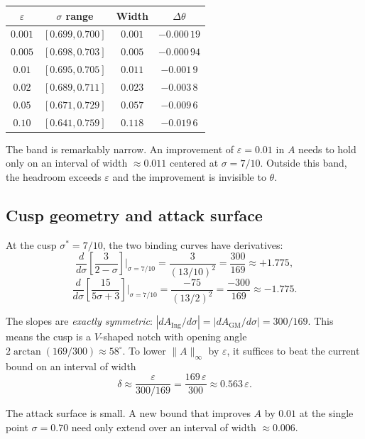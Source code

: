 \documentclass[11pt,a4paper]{article}
\begin{document}
\begin{center}
\begin{tabular}{cccc}
\toprule
$\varepsilon$ & $\sigma$ range & Width & $\Delta\theta$ \\
\midrule
$0.001$ & $[0.699, 0.700]$ & $0.001$ & $-0.000\,19$ \\
$0.005$ & $[0.698, 0.703]$ & $0.005$ & $-0.000\,94$ \\
$0.01$  & $[0.695, 0.705]$ & $0.011$ & $-0.001\,9$  \\
$0.02$  & $[0.689, 0.711]$ & $0.023$ & $-0.003\,8$  \\
$0.05$  & $[0.671, 0.729]$ & $0.057$ & $-0.009\,6$  \\
$0.10$  & $[0.641, 0.759]$ & $0.118$ & $-0.019\,6$  \\
\bottomrule
\end{tabular}
\end{center}

The band is remarkably narrow.  An improvement of $\varepsilon = 0.01$ in $A$ needs to hold only on an interval of width $\approx 0.011$ centered at $\sigma = 7/10$.  Outside this band, the headroom exceeds $\varepsilon$ and the improvement is invisible to $\theta$.

\subsection*{Cusp geometry and attack surface}

At the cusp $\sigma^{*} = 7/10$, the two binding curves have derivatives:
\[
  \frac{d}{d\sigma}\!\left[\frac{3}{2 - \sigma}\right]\bigg|_{\sigma = 7/10}
  = \frac{3}{(13/10)^{2}} = \frac{300}{169} \approx +1.775,
\]
\[
  \frac{d}{d\sigma}\!\left[\frac{15}{5\sigma + 3}\right]\bigg|_{\sigma = 7/10}
  = \frac{-75}{(13/2)^{2}} = \frac{-300}{169} \approx -1.775.
\]

The slopes are \emph{exactly symmetric}: $|dA_{\mathrm{Ing}}/d\sigma| = |dA_{\mathrm{GM}}/d\sigma| = 300/169$.  This means the cusp is a $V$-shaped notch with opening angle $2\arctan(169/300) \approx 58^{\circ}$.  To lower $\|A\|_{\infty}$ by $\varepsilon$, it suffices to beat the current bound on an interval of width
\[
  \delta \approx \frac{\varepsilon}{300/169} = \frac{169\,\varepsilon}{300} \approx 0.563\,\varepsilon.
\]

The attack surface is small.  A new bound that improves $A$ by $0.01$ at the single point $\sigma = 0.70$ need only extend over an interval of width $\approx 0.006$.
\end{document}

